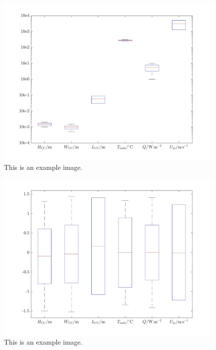         \begin{figure}[H]
            \centering
            \includegraphics[width=1\textwidth]{00_Images/00_Small_Stack_Images/00_Combined_Boxplot_Features_July_10_2024_v1.jpg}  %
            \caption{This is an example image.}
            \label{fig:example1}
        \end{figure}

        \begin{figure}[H]
            \centering
            \includegraphics[width=1\textwidth]{00_Images/00_Small_Stack_Images/00_Combined_Boxplot_Normalized_Features_July_10_2024_v1.jpg}  %
            \caption{This is an example image.}
            \label{fig:example1}
        \end{figure}

